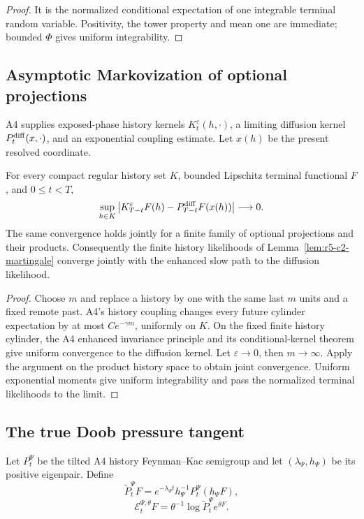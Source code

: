 \begin{proof}
It is the normalized conditional expectation of one integrable terminal
random variable.  Positivity, the tower property and mean one are immediate;
bounded \(\Phi\) gives uniform integrability.
\end{proof}

\subsection{Asymptotic Markovization of optional projections}

A4 supplies exposed-phase history kernels
\(K_t^\varepsilon(h,\cdot)\), a limiting diffusion kernel
\(P_t^{\rm diff}(x,\cdot)\), and an exponential coupling estimate.  Let
\(x(h)\) be the present resolved coordinate.

\begin{theorem}
\label{thm:r5-c2-markovization}
For every compact regular history set \(K\), bounded Lipschitz terminal
functional \(F\), and \(0\le t<T\),
\[
 \sup_{h\in K}
 \left|
  K_{T-t}^\varepsilon F(h)
  -P_{T-t}^{\rm diff}F(x(h))
 \right|\longrightarrow0.
\]
The same convergence holds jointly for a finite family of optional
projections and their products.  Consequently the finite history likelihoods
of Lemma~\ref{lem:r5-c2-martingale} converge jointly with the enhanced slow
path to the diffusion likelihood.
\end{theorem}

\begin{proof}
Choose \(m\) and replace a history by one with the same last \(m\) units and a
fixed remote past.  A4's history coupling changes every future cylinder
expectation by at most \(Ce^{-\gamma m}\), uniformly on \(K\).  On the fixed
finite history cylinder, the A4 enhanced invariance principle and its
conditional-kernel theorem give uniform convergence to the diffusion kernel.
Let \(\varepsilon\to0\), then \(m\to\infty\).  Apply the argument on the
product history space to obtain joint convergence.  Uniform exponential
moments give uniform integrability and pass the normalized terminal
likelihoods to the limit.
\end{proof}

\subsection{The true Doob pressure tangent}

Let \(P_t^\Psi\) be the tilted A4 history Feynman--Kac semigroup and let
\((\lambda_\Psi,h_\Psi)\) be its positive eigenpair.  Define
\[
 \widetilde P_t^\Psi F=
 e^{-\lambda_\Psi t}h_\Psi^{-1}P_t^\Psi(h_\Psi F),
\]
\[
 \mathcal E_t^{\Psi,\theta}F=
 \theta^{-1}\log\widetilde P_t^\Psi e^{\theta F}.
\]

